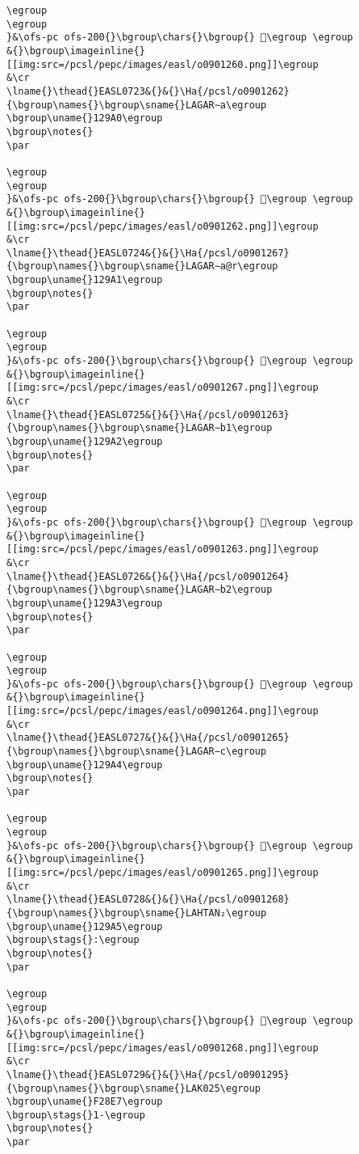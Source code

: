\begin{verbatim}
\egroup
\egroup
}&\ofs-pc ofs-200{}\bgroup\chars{}\bgroup{} 𒦟\egroup \egroup
&{}\bgroup\imageinline{}[[img:src=/pcsl/pepc/images/easl/o0901260.png]]\egroup
&\cr
\lname{}\thead{}EASL0723&{}&{}\Ha{/pcsl/o0901262}{\bgroup\names{}\bgroup\sname{}LAGAR∼a\egroup
\bgroup\uname{}129A0\egroup
\bgroup\notes{}
\par 

\egroup
\egroup
}&\ofs-pc ofs-200{}\bgroup\chars{}\bgroup{} 𒦠\egroup \egroup
&{}\bgroup\imageinline{}[[img:src=/pcsl/pepc/images/easl/o0901262.png]]\egroup
&\cr
\lname{}\thead{}EASL0724&{}&{}\Ha{/pcsl/o0901267}{\bgroup\names{}\bgroup\sname{}LAGAR∼a@r\egroup
\bgroup\uname{}129A1\egroup
\bgroup\notes{}
\par 

\egroup
\egroup
}&\ofs-pc ofs-200{}\bgroup\chars{}\bgroup{} 𒦡\egroup \egroup
&{}\bgroup\imageinline{}[[img:src=/pcsl/pepc/images/easl/o0901267.png]]\egroup
&\cr
\lname{}\thead{}EASL0725&{}&{}\Ha{/pcsl/o0901263}{\bgroup\names{}\bgroup\sname{}LAGAR∼b1\egroup
\bgroup\uname{}129A2\egroup
\bgroup\notes{}
\par 

\egroup
\egroup
}&\ofs-pc ofs-200{}\bgroup\chars{}\bgroup{} 𒦢\egroup \egroup
&{}\bgroup\imageinline{}[[img:src=/pcsl/pepc/images/easl/o0901263.png]]\egroup
&\cr
\lname{}\thead{}EASL0726&{}&{}\Ha{/pcsl/o0901264}{\bgroup\names{}\bgroup\sname{}LAGAR∼b2\egroup
\bgroup\uname{}129A3\egroup
\bgroup\notes{}
\par 

\egroup
\egroup
}&\ofs-pc ofs-200{}\bgroup\chars{}\bgroup{} 𒦣\egroup \egroup
&{}\bgroup\imageinline{}[[img:src=/pcsl/pepc/images/easl/o0901264.png]]\egroup
&\cr
\lname{}\thead{}EASL0727&{}&{}\Ha{/pcsl/o0901265}{\bgroup\names{}\bgroup\sname{}LAGAR∼c\egroup
\bgroup\uname{}129A4\egroup
\bgroup\notes{}
\par 

\egroup
\egroup
}&\ofs-pc ofs-200{}\bgroup\chars{}\bgroup{} 𒦤\egroup \egroup
&{}\bgroup\imageinline{}[[img:src=/pcsl/pepc/images/easl/o0901265.png]]\egroup
&\cr
\lname{}\thead{}EASL0728&{}&{}\Ha{/pcsl/o0901268}{\bgroup\names{}\bgroup\sname{}LAHTAN₂\egroup
\bgroup\uname{}129A5\egroup
\bgroup\stags{}:\egroup
\bgroup\notes{}
\par 

\egroup
\egroup
}&\ofs-pc ofs-200{}\bgroup\chars{}\bgroup{} 𒦥\egroup \egroup
&{}\bgroup\imageinline{}[[img:src=/pcsl/pepc/images/easl/o0901268.png]]\egroup
&\cr
\lname{}\thead{}EASL0729&{}&{}\Ha{/pcsl/o0901295}{\bgroup\names{}\bgroup\sname{}LAK025\egroup
\bgroup\uname{}F28E7\egroup
\bgroup\stags{}1-\egroup
\bgroup\notes{}
\par 


\end{verbatim}
